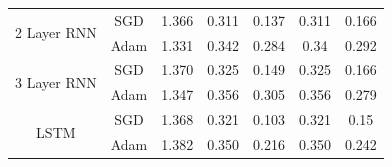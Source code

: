 \documentclass[pdf, 9pt]{beamer}
\begin{document}
\begin{frame}
\begin{table}[]
{\begin{tabular}{|c|c|c|c|c|c|c|}
				\multirow{2}{*}{2 Layer RNN}      & SGD  & 1.366 & 0.311 & 0.137 & 0.311 & 0.166 \\
				& Adam & 1.331 & 0.342 & 0.284 & 0.34  & 0.292 \\ \hline
				\multirow{2}{*}{3 Layer RNN}      & SGD  & 1.370 & 0.325 & 0.149 & 0.325 & 0.166 \\
				& Adam & 1.347 & 0.356 & 0.305 & 0.356 & 0.279 \\ \hline
				\multirow{2}{*}{LSTM}             & SGD  & 1.368 & 0.321 & 0.103 & 0.321 & 0.15  \\
				& Adam & 1.382 & 0.350 & 0.216 & 0.350 & 0.242 \\ \hline
			\end{tabular}%
			}
			\label{model_training_metrics}
		\end{table}
	\end{frame}
	
\end{document}
